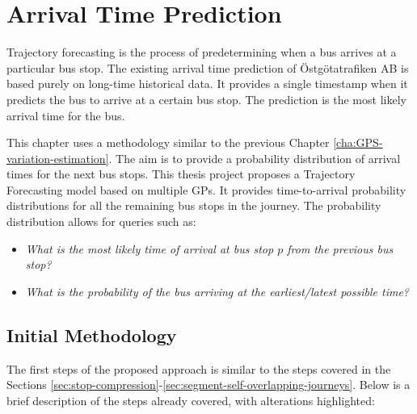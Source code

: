 \chapter{Arrival Time Prediction}
\label{cha:arrival-time-prediction}

Trajectory forecasting is the process of predetermining when a bus arrives at a particular bus stop.
The existing arrival time prediction of Östgötatrafiken AB is based purely on long-time historical data.
It provides a single timestamp when it predicts the bus to arrive at a certain bus stop.
The prediction is the most likely arrival time for the bus.

This chapter uses a methodology similar to the previous Chapter \ref{cha:GPS-variation-estimation}.
The aim is to provide a probability distribution of arrival times for the next bus stops.
This thesis project proposes a Trajectory Forecasting model based on multiple GPs.
It provides time-to-arrival probability distributions for all the remaining bus stops in the journey.
The probability distribution allows for queries such as:
\begin{itemize}
    \item \textit{What is the most likely time of arrival at bus stop $p$ from the previous bus stop?}
    \item \textit{What is the probability of the bus arriving at the earliest/latest possible time?}
\end{itemize}

\section{Initial Methodology} \label{sec:initial-methodology}
The first steps of the proposed approach is similar to the steps covered in the Sections \ref{sec:stop-compression}-\ref{sec:segment-self-overlapping-journeys}.
Below is a brief description of the steps already covered, with alterations highlighted:

